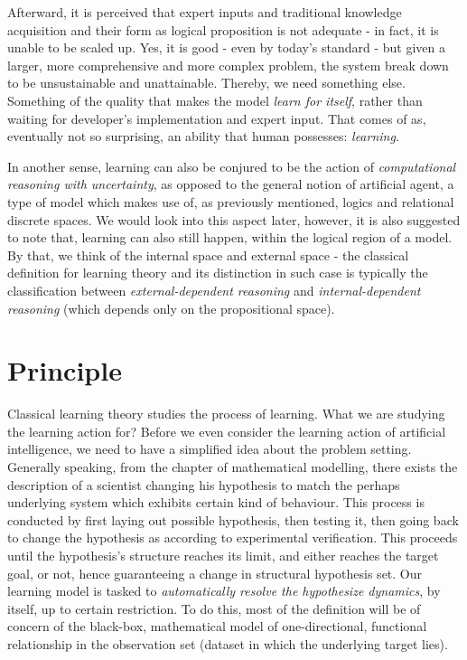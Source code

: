 Afterward, it is perceived that expert inputs and traditional knowledge acquisition and their form as logical proposition is not adequate - in fact, it is unable to be scaled up. Yes, it is good - even by today's standard - but given a larger, more comprehensive and more complex problem, the system break down to be unsustainable and unattainable. Thereby, we need something else. Something of the quality that makes the model \textit{learn for itself}, rather than waiting for developer's implementation and expert input. That comes of as, eventually not so surprising, an ability that human possesses: \textit{learning}. 

In another sense, learning can also be conjured to be the action of \textit{computational reasoning with uncertainty}, as opposed to the general notion of artificial agent, a type of model which makes use of, as previously mentioned, logics and relational discrete spaces. We would look into this aspect later, however, it is also suggested to note that, learning can also still happen, within the logical region of a model. By that, we think of the internal space and external space - the classical definition for learning theory and its distinction in such case is typically the classification between \textit{external-dependent reasoning} and \textit{internal-dependent reasoning} (which depends only on the propositional space). 

\section{Principle}

Classical learning theory studies the process of learning. What we are studying the learning action for? Before we even consider the learning action of artificial intelligence, we need to have a simplified idea about the problem setting. Generally speaking, from the chapter of mathematical modelling, there exists the description of a scientist changing his hypothesis to match the perhaps underlying system which exhibits certain kind of behaviour. This process is conducted by first laying out possible hypothesis, then testing it, then going back to change the hypothesis as according to experimental verification. This proceeds until the hypothesis's structure reaches its limit, and either reaches the target goal, or not, hence guaranteeing a change in structural hypothesis set. Our learning model is tasked to \textit{automatically resolve the hypothesize dynamics}, by itself, up to certain restriction. To do this, most of the definition will be of concern of the black-box, mathematical model of one-directional, functional relationship in the observation set (dataset in which the underlying target lies). 

